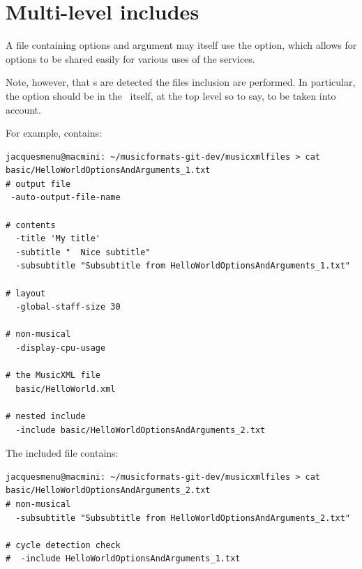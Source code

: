 \section{Multi-level includes}

A file containing options and argument may itself use the  option, which allows for options to be shared easily for various uses of the services.

Note, however, that \earlyOption s are detected  the files inclusion are performed. In particular, the  option should be in the \CLI\ itself, at the top level so to say, to be taken into account.

For example,  contains:
\begin{lstlisting}[language=Terminal]
jacquesmenu@macmini: ~/musicformats-git-dev/musicxmlfiles > cat basic/HelloWorldOptionsAndArguments_1.txt
# output file
 -auto-output-file-name

# contents
  -title 'My title'
  -subtitle "  Nice subtitle"
  -subsubtitle "Subsubtitle from HelloWorldOptionsAndArguments_1.txt"

# layout
  -global-staff-size 30

# non-musical
  -display-cpu-usage

# the MusicXML file
  basic/HelloWorld.xml

# nested include
  -include basic/HelloWorldOptionsAndArguments_2.txt
\end{lstlisting}

The included  file contains:
\begin{lstlisting}[language=Terminal]
jacquesmenu@macmini: ~/musicformats-git-dev/musicxmlfiles > cat basic/HelloWorldOptionsAndArguments_2.txt
# non-musical
  -subsubtitle "Subsubtitle from HelloWorldOptionsAndArguments_2.txt"

# cycle detection check
#  -include HelloWorldOptionsAndArguments_1.txt
\end{lstlisting}

